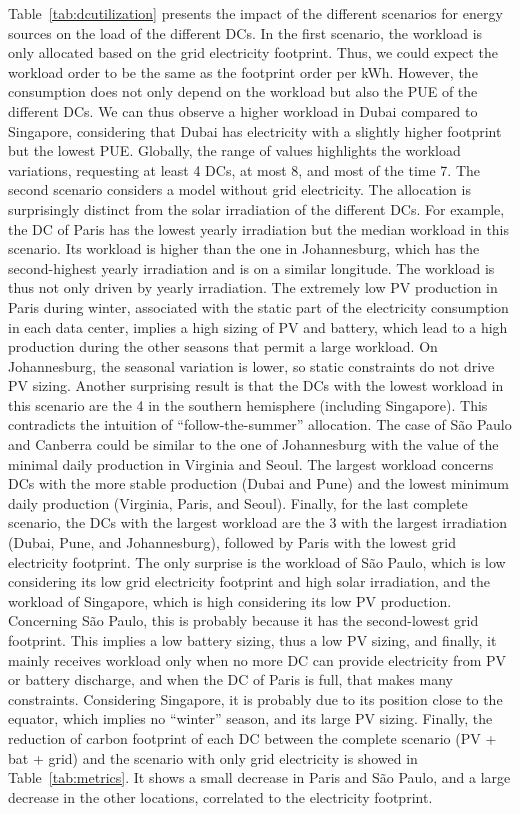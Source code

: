 Table~\ref{tab:dcutilization} presents the impact of the different scenarios for energy sources on the load of the different DCs. In the first scenario, the workload is only allocated based on the grid electricity footprint. Thus, we could expect the workload order to be the same as the footprint order per kWh. However, the consumption does not only depend on the workload but also the PUE of the different DCs. We can thus observe a higher workload in Dubai compared to Singapore, considering that Dubai has electricity with a slightly higher footprint but the lowest PUE. Globally, the range of values highlights the workload variations, requesting at least 4 DCs, at most 8, and most of the time 7. The second scenario considers a model without grid electricity. The allocation is surprisingly distinct from the solar irradiation of the different DCs. For example, the DC of Paris has the lowest yearly irradiation but the median workload in this scenario. Its workload is higher than the one in Johannesburg, which has the second-highest yearly irradiation and is on a similar longitude. The workload is thus not only driven by yearly irradiation. The extremely low PV production in Paris during winter, associated with the static part of the electricity consumption in each data center, implies a high sizing of PV and battery, which lead to a high production during the other seasons that permit a large workload. On Johannesburg, the seasonal variation is lower, so static constraints do not drive PV sizing. Another surprising result is that the DCs with the lowest workload in this scenario are the 4 in the southern hemisphere (including Singapore). This contradicts the intuition of ``follow-the-summer'' allocation. The case of S\~ao Paulo and Canberra could be similar to the one of Johannesburg with the value of the minimal daily production in Virginia and Seoul. The largest workload concerns DCs with the more stable production (Dubai and Pune) and the lowest minimum daily production (Virginia, Paris, and Seoul). Finally, for the last complete scenario, the DCs with the largest workload are the 3 with the largest irradiation (Dubai, Pune, and Johannesburg), followed by Paris with the lowest grid electricity footprint. The only surprise is the workload of S\~ao Paulo, which is low considering its low grid electricity footprint and high solar irradiation, and the workload of Singapore, which is high considering its low PV production. Concerning S\~ao Paulo, this is probably because it has the second-lowest grid footprint. This implies a low battery sizing, thus a low PV sizing, and finally, it mainly receives workload only when no more DC can provide electricity from PV or battery discharge, and when the DC of Paris is full, that makes many constraints. Considering Singapore, it is probably due to its position close to the equator, which implies no ``winter'' season, and its large PV sizing. Finally, the reduction of carbon footprint of each DC between the complete scenario (PV + bat + grid) and the scenario with only grid electricity is showed in Table~\ref{tab:metrics}. It shows a small decrease in Paris and S\~ao Paulo, and a large decrease in the other locations, correlated to the electricity footprint.


